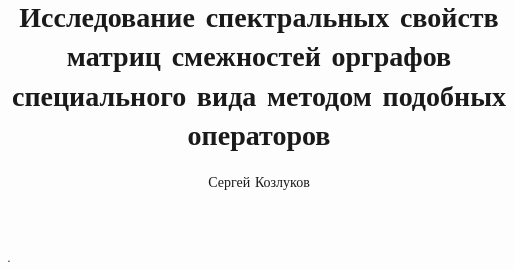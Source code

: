 \documentclass[11pt,a4paper]{article}
\title{Исследование спектральных свойств матриц
смежностей орграфов специального вида
методом подобных операторов}
\author{Сергей Козлуков}
\begin{document}
\maketitle

\begin{abstract}
    
\end{abstract}


\printbibliography.
\end{document}
